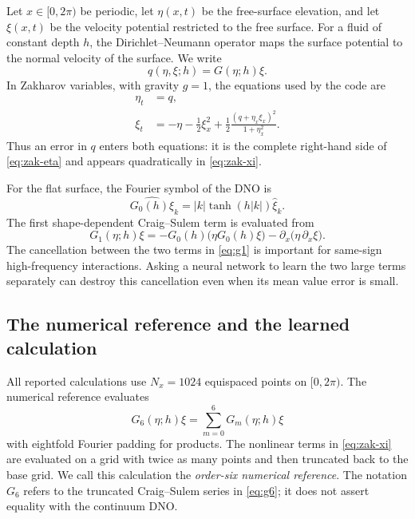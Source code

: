 \documentclass[11pt]{article}
\newcommand{\Gref}{G_{6}}
\begin{document}
Let $x\in[0,2\pi)$ be periodic, let $\eta(x,t)$ be the free-surface elevation,
and let $\xi(x,t)$ be the velocity potential restricted to the free surface.
For a fluid of constant depth $h$, the Dirichlet--Neumann operator maps the
surface potential to the normal velocity of the surface.  We write
\begin{equation}
  q(\eta,\xi;h)=G(\eta;h)\xi.
  \label{eq:q-def}
\end{equation}
In Zakharov variables, with gravity $g=1$, the equations used by the code are
\begin{align}
  \eta_t
  &=q,                                                    \label{eq:zak-eta}\\
  \xi_t
  &=-\eta-\frac12\xi_x^2
    +\frac12\frac{(q+\eta_x\xi_x)^2}{1+\eta_x^2}.        \label{eq:zak-xi}
\end{align}
Thus an error in $q$ enters both equations: it is the complete right-hand side
of \eqref{eq:zak-eta} and appears quadratically in \eqref{eq:zak-xi}.

For the flat surface, the Fourier symbol of the DNO is
\begin{equation}
  \widehat{G_0(h)\xi}_k=|k|\tanh(h|k|)\widehat\xi_k.
  \label{eq:g0}
\end{equation}
The first shape-dependent Craig--Sulem term is evaluated from
\begin{equation}
  G_1(\eta;h)\xi
  =-G_0(h)\bigl(\eta G_0(h)\xi\bigr)
   -\partial_x\bigl(\eta\,\partial_x\xi\bigr).
  \label{eq:g1}
\end{equation}
The cancellation between the two terms in \eqref{eq:g1} is important for
same-sign high-frequency interactions.  Asking a neural network to learn the
two large terms separately can destroy this cancellation even when its mean
value error is small.

\subsection{The numerical reference and the learned calculation}

All reported calculations use $N_x=1024$ equispaced points on $[0,2\pi)$.
The numerical reference evaluates
\begin{equation}
  \Gref(\eta;h)\xi=\sum_{m=0}^{6}G_m(\eta;h)\xi
  \label{eq:g6}
\end{equation}
with eightfold Fourier padding for products.  The nonlinear terms in
\eqref{eq:zak-xi} are evaluated on a grid with twice as many points and then
truncated back to the base grid.  We call this calculation the
\emph{order-six numerical reference}.  The notation $G_6$ refers to the
truncated Craig--Sulem series in \eqref{eq:g6}; it does not assert equality
with the continuum DNO.
\end{document}
